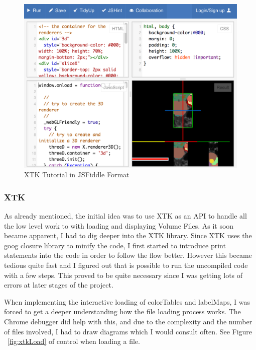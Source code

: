 \documentclass[a4paper,11pt,twoside]{article}
\begin{document}
\begin{figure}[ht!]
\centering
\includegraphics[width=140mm]{graphics/jsFiddle_01.png}
\caption{XTK Tutorial in JSFiddle Format}
\label{fig:UIdesign1}
\end{figure}




\subsubsection{XTK}


As already mentioned, the initial idea was to use XTK as an API to handle all the low level work to with loading and displaying Volume Files. As it soon became apparent, I had to dig deeper into the XTK library. Since XTK uses the goog closure library to minify the code, I first started to introduce print statements into the code in order to follow the flow better. However this became tedious quite fast and I figured out that is possible to run the uncompiled code with a few steps. This proved to be quite necessary since I was getting lots of errors at later stages of the project.



When implementing the interactive loading of colorTables and labelMaps, I was forced to get a deeper understanding how the file loading process works. The Chrome debugger did help with this, and due to the complexity and the number of files involved, I had to draw diagrams which I would consult often. See Figure ~\ref{fig:xtkLoad} of control when loading a file.
\end{document}
